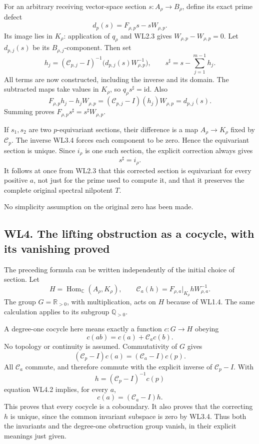 For an arbitrary receiving vector-space section \(s:A_\rho\to B_\rho\),
define its exact prime defect \[
 d_p(s)=F_{\rho,p}s-sW_{\rho,p}.
\tag{WL3.5}
\] Its image lies in \(K_\rho\): application of \(q_\rho\) and WL2.3
gives \(W_{\rho,p}-W_{\rho,p}=0\). Let \(d_{p,j}(s)\) be its
\(B_{\rho,j}\)-component. Then set \[
 h_j=(\mathscr C_{p,j}-I)^{-1}
 \bigl(d_{p,j}(s)W_{\rho,p}^{-1}\bigr),\qquad
 s^\sharp=s-\sum_{j=1}^{m-1}h_j.
\tag{WL3.6}
\] All terms are now constructed, including the inverse and its domain.
The subtracted maps take values in \(K_\rho\), so
\(q_\rho s^\sharp=\mathrm{id}\). Also \[
 F_{\rho,p}h_j-h_jW_{\rho,p}
 =(\mathscr C_{p,j}-I)(h_j)W_{\rho,p}
 =d_{p,j}(s).
\] Summing proves \(F_{\rho,p}s^\sharp=s^\sharp W_{\rho,p}\).

If \(s_1,s_2\) are two \(p\)-equivariant sections, their difference is a
map \(A_\rho\to K_\rho\) fixed by \(\mathscr C_p\). The inverse WL3.4
forces each component to be zero. Hence the equivariant section is
unique. Since \(i_\rho\) is one such section, the explicit correction
always gives \[
 \boxed{s^\sharp=i_\rho.}
\tag{WL3.7}
\] It follows at once from WL2.3 that this corrected section is
equivariant for every positive \(a\), not just for the prime used to
compute it, and that it preserves the complete original spectral
nilpotent \(T\).

No simplicity assumption on the original zero has been made.

\subsection{WL4. The lifting obstruction as a cocycle, with its
vanishing
proved}\label{wl4.-the-lifting-obstruction-as-a-cocycle-with-its-vanishing-proved}

The preceding formula can be written independently of the initial choice
of section. Let \[
 H=\operatorname{Hom}_{\mathbb C}(A_\rho,K_\rho),\qquad
 \mathscr C_a(h)=F_{\rho,a}|_{K_\rho}hW_{\rho,a}^{-1}.
\] The group \(G=\mathbb R_{>0}\), with multiplication, acts on \(H\)
because of WL1.4. The same calculation applies to its subgroup
\(\mathbb Q_{>0}\).

A degree-one cocycle here means exactly a function \(c:G\to H\) obeying
\[
 c(ab)=c(a)+\mathscr C_a c(b).
\tag{WL4.1}
\] No topology or continuity is assumed. Commutativity of \(G\) gives \[
 (\mathscr C_p-I)c(a)=(\mathscr C_a-I)c(p).
\tag{WL4.2}
\] All \(\mathscr C_a\) commute, and therefore commute with the explicit
inverse of \(\mathscr C_p-I\). With \[
 h=(\mathscr C_p-I)^{-1}c(p)
\] equation WL4.2 implies, for every \(a\), \[
 c(a)=(\mathscr C_a-I)h.
\tag{WL4.3}
\] This proves that every cocycle is a coboundary. It also proves that
the correcting \(h\) is unique, since the common invariant subspace is
zero by WL3.4. Thus both the invariants and the degree-one obstruction
group vanish, in their explicit meanings just given.

